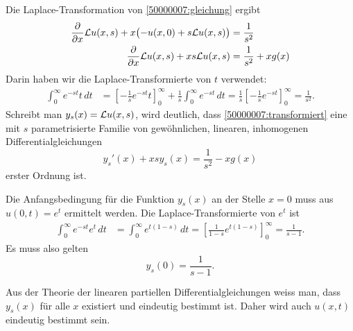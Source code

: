 \begin{loesung}
\begin{teilaufgaben}
\item
Die Laplace-Transformation von \eqref{50000007:gleichung} ergibt
\begin{align}
\frac{\partial}{\partial x}{\cal L}u(x,s)
+x\bigl(-u(x,0)+s{\cal L}u(x,s)\bigr)&=\frac1{s^2}
\notag
\\
\frac{\partial}{\partial x}{\cal L}u(x,s)
+xs{\cal L}u(x,s)&=\frac1{s^2}+xg(x)
\label{50000007:transformiert}
\end{align}
Darin haben wir die Laplace-Transformierte von $t$ verwendet:
\begin{align*}
\int_0^\infty e^{-st}t\,dt
&=
\left[
-\frac1{s} e^{-st}t
\right]_0^\infty
+\frac1s\int_0^\infty e^{-st}\,dt
=\frac1s\left[
-\frac1se^{-st}
\right]_0^\infty=\frac1{s^2}.
\end{align*}
Schreibt man $y_s(x)={\cal L}u(x,s)$, wird deutlich,
dass \eqref{50000007:transformiert} eine mit $s$ parametrisierte
Familie von gewöhnlichen, linearen, inhomogenen Differentialgleichungen
\begin{equation}
y_s'(x)+xsy_s(x)=\frac1{s^2}-xg(x)
\label{50000007:family}
\end{equation}
erster Ordnung ist.

Die Anfangsbedingung für die Funktion $y_s(x)$ an der Stelle $x=0$
muss aus $u(0,t)=e^t$ ermittelt werden.
Die Laplace-Transformierte von $e^t$ ist
\begin{align*}
\int_0^\infty e^{-st}e^t\,dt
&=
\int_0^\infty e^{t(1-s)}\,dt
=\left[\frac1{1-s}e^{t(1-s)}\right]_0^\infty=\frac1{s-1}.
\end{align*}
Es muss also gelten
\[
y_s(0)=\frac1{s-1}.
\]
\item
Aus der Theorie der linearen partiellen Differentialgleichungen weiss man,
dass $y_s(x)$ für alle $x$ existiert und eindeutig bestimmt ist. 
Daher wird auch $u(x,t)$ eindeutig bestimmt sein.


\end{teilaufgaben}
\end{loesung}
